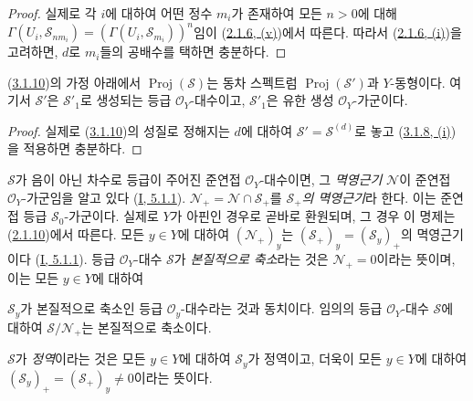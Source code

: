 \begin{proof}
실제로 각 $i$에 대하여 어떤 정수 $m_i$가 존재하여 모든 $n>0$에 대해
$\Gamma(U_i,\mathcal{S}_{nm_i})=(\Gamma(U_i,\mathcal{S}_{m_i}))^n$임이
(\hyperref[II.2.1.6-ko]{2.1.6, (v)})에서 따른다. 따라서
(\hyperref[II.2.1.6-ko]{2.1.6, (i)})을 고려하면, $d$로 $m_i$들의
공배수를 택하면 충분하다.
\end{proof}

\begin{corollary}[3.1.11]
\label{II.3.1.11-ko}
(\hyperref[II.3.1.10-ko]{3.1.10})의 가정 아래에서
$\operatorname{Proj}(\mathcal{S})$는 동차 스펙트럼
$\operatorname{Proj}(\mathcal{S}')$과 $Y$-동형이다. 여기서
$\mathcal{S}'$은 $\mathcal{S}'_1$로 생성되는 등급
$\mathcal{O}_Y$-대수이고, $\mathcal{S}'_1$은 유한 생성
$\mathcal{O}_Y$-가군이다.
\end{corollary}

\begin{proof}
실제로 (\hyperref[II.3.1.10-ko]{3.1.10})의 성질로 정해지는 $d$에 대하여
$\mathcal{S}'=\mathcal{S}^{(d)}$로 놓고
(\hyperref[II.3.1.8-ko]{3.1.8, (i)})을 적용하면 충분하다.
\end{proof}

\begin{env}[3.1.12]
\label{II.3.1.12-ko}
$\mathcal{S}$가 음이 아닌 차수로 등급이 주어진 준연접
$\mathcal{O}_Y$-대수이면, 그 \emph{멱영근기} $\mathcal{N}$이 준연접
$\mathcal{O}_Y$-가군임을 알고 있다
(\hyperref[I.5.1.1-ko]{I, 5.1.1}).
$\mathcal{N}_+=\mathcal{N}\cap\mathcal{S}_+$를
\emph{$\mathcal{S}_+$의 멱영근기}라 한다. 이는 준연접 등급
$\mathcal{S}_0$-가군이다. 실제로 $Y$가 아핀인 경우로 곧바로 환원되며,
그 경우 이 명제는 (\hyperref[II.2.1.10-ko]{2.1.10})에서 따른다. 모든
$y\in Y$에 대하여 $(\mathcal{N}_+)_y$는
$(\mathcal{S}_+)_y=(\mathcal{S}_y)_+$의 멱영근기이다
(\hyperref[I.5.1.1-ko]{I, 5.1.1}). 등급 $\mathcal{O}_Y$-대수
$\mathcal{S}$가 \emph{본질적으로 축소}라는 것은
$\mathcal{N}_+=0$이라는 뜻이며, 이는 모든 $y\in Y$에 대하여


$\mathcal{S}_y$가 본질적으로 축소인 등급 $\mathcal{O}_y$-대수라는 것과
동치이다. 임의의 등급 $\mathcal{O}_Y$-대수 $\mathcal{S}$에 대하여
$\mathcal{S}/\mathcal{N}_+$는 본질적으로 축소이다.

$\mathcal{S}$가 \emph{정역}이라는 것은 모든 $y\in Y$에 대하여
$\mathcal{S}_y$가 정역이고, 더욱이 모든 $y\in Y$에 대하여
$(\mathcal{S}_y)_+=(\mathcal{S}_+)_y\neq0$이라는 뜻이다.
\end{env}

